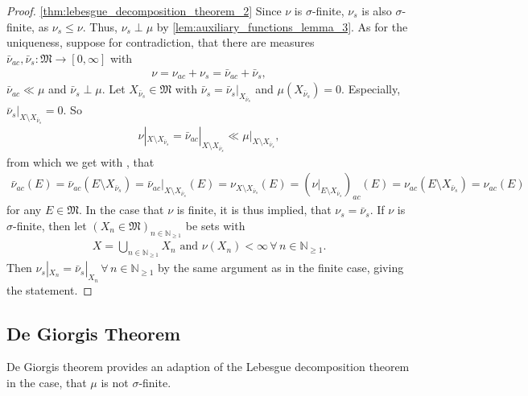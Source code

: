 \documentclass[10pt, leqno]{amsart}
\theoremstyle{definition}
\theoremstyle{remark}
\begin{document}
\begin{proof}
        \ref{thm:lebesgue_decomposition_theorem_2} Since \(\nu\) is \(\sigma\)-finite, \(\nu_s\) is also \(\sigma\)-finite, as \(\nu_s \leq \nu\). Thus, \(\nu_s \perp \mu\) by  \ref{lem:auxiliary_functions_lemma_3}. As for the uniqueness, suppose for contradiction, that there are measures \(\bar{\nu}_{ac}, \bar{\nu}_s\colon \mathfrak{M} \to [0, \infty]\) with
        \begin{align}
            \nu = \nu_{ac} + \nu_s = \bar{\nu}_{ac} + \bar{\nu}_s,
        \end{align}
        \(\bar{\nu}_{ac} \ll \mu\) and \(\bar{\nu}_s \perp \mu\). Let \(X_{\bar{\nu}_s} \in \mathfrak{M}\) with \(\bar{\nu}_s = \bar{\nu}_s|_{X_{\bar{\nu}_s}}\) and \(\mu(X_{\bar{\nu}_s}) = 0\). Especially, \(\bar{\nu}_s|_{X \setminus X_{\bar{\nu}_s}} = 0\). So
        \begin{align}
            \nu|_{X \setminus X_{\bar{\nu}_s}} = \bar{\nu}_{ac}|_{X \setminus X_{\bar{\nu}_s}} \ll \mu|_{X \setminus X_{\bar{\nu}_s}},
        \end{align}
        from which we get with , that
        \begin{align}
            \bar{\nu}_{ac}(E) = \bar{\nu}_{ac}(E \setminus X_{\bar{\nu}_s}) = \bar{\nu}_{ac}|_{X \setminus X_{\bar{\nu}_s}}(E) = \nu_{X \setminus X_{\bar{\nu}_s}}(E) = (\nu|_{E \setminus X_{\bar{\nu}_s}})_{ac}(E) = \nu_{ac}(E \setminus X_{\bar{\nu}_{s}}) = \nu_{ac}(E)
        \end{align}
        for any \(E \in \mathfrak{M}\). In the case that \(\nu\) is finite, it is thus implied, that \(\nu_s = \bar{\nu}_s\). If \(\nu\) is \(\sigma\)-finite, then let \((X_n \in \mathfrak{M})_{n \in \mathbb{N}_{\geq 1}}\) be sets with
        \begin{align}
            X = \bigcup_{n \in \mathbb{N}_{\geq 1}} X_n \text{ and } \nu(X_n) < \infty \, \forall \, n \in \mathbb{N}_{\geq 1}.
        \end{align}
        Then \(\nu_s|_{X_n} = \bar{\nu}_s|_{X_n} \, \forall \, n \in \mathbb{N}_{\geq 1}\) by the same argument as in the finite case, giving the statement.
    \end{proof}

    \subsection{De Giorgis Theorem}

    De Giorgis theorem provides an adaption of the Lebesgue decomposition theorem in the case, that \(\mu\) is not \(\sigma\)-finite.
\end{document}
